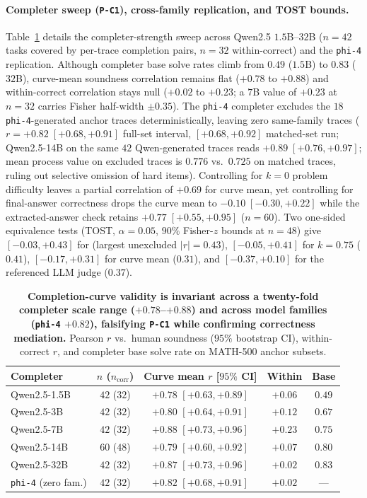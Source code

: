 \paragraph{Completer sweep (\texttt{P-C1}), cross-family replication, and TOST bounds.}
Table~\ref{tab:completer} details the completer-strength sweep across Qwen2.5 $1.5$B--$32$B ($n{=}42$ tasks covered by per-trace completion pairs, $n{=}32$ within-correct) and the \texttt{phi-4} replication.
Although completer base solve rates climb from $0.49$ ($1.5$B) to $0.83$ ($32$B), curve-mean soundness correlation remains flat ($+0.78$ to $+0.88$) and within-correct correlation stays null ($+0.02$ to $+0.23$; a $7$B value of $+0.23$ at $n{=}32$ carries Fisher half-width $\pm 0.35$).
The \texttt{phi-4} completer excludes the $18$ \texttt{phi-4}-generated anchor traces deterministically, leaving zero same-family traces ($r = +0.82 \; [+0.68, +0.91]$ full-set interval, $[+0.68, +0.92]$ matched-set run; Qwen2.5-14B on the same $42$ Qwen-generated traces reads $+0.89 \; [+0.76, +0.97]$; mean process value on excluded traces is $0.776$ vs.\ $0.725$ on matched traces, ruling out selective omission of hard items).
Controlling for $k{=}0$ problem difficulty leaves a partial correlation of $+0.69$ for curve mean, yet controlling for final-answer correctness drops the curve mean to $-0.10 \; [-0.30, +0.22]$ while the extracted-answer check retains $+0.77 \; [+0.55, +0.95]$ ($n{=}60$).
Two one-sided equivalence tests (TOST, $\alpha{=}0.05$, $90\%$ Fisher-$z$ bounds at $n{=}48$) give $[-0.03, +0.43]$ for \tfa{} (largest unexcluded $|r| = 0.43$), $[-0.05, +0.41]$ for $k{=}0.75$ ($0.41$), $[-0.17, +0.31]$ for curve mean ($0.31$), and $[-0.37, +0.10]$ for the referenced LLM judge ($0.37$).

\begin{table}[t]
\centering
\caption{\textbf{Completion-curve validity is invariant across a twenty-fold completer scale range ($+0.78$--$+0.88$) and across model families (\texttt{phi-4} $+0.82$), falsifying \texttt{P-C1} while confirming correctness mediation.} Pearson $r$ vs.\ human soundness ($95\%$ bootstrap CI), within-correct $r$, and completer base solve rate on \textsc{MATH-500} anchor subsets.}
\label{tab:completer}
\scriptsize
\setlength{\tabcolsep}{1.8pt}
\begin{tabular}{@{}lcccc@{}}
\toprule
Completer & $n$ ($n_{\text{corr}}$) & Curve mean $r$ [$95\%$ CI] & Within & Base \\
\midrule
Qwen2.5-1.5B & $42$ ($32$) & $+0.78$ $[+0.63, +0.89]$ & $+0.06$ & $0.49$ \\
Qwen2.5-3B & $42$ ($32$) & $+0.80$ $[+0.64, +0.91]$ & $+0.12$ & $0.67$ \\
Qwen2.5-7B & $42$ ($32$) & $+0.88$ $[+0.73, +0.96]$ & $+0.23$ & $0.75$ \\
Qwen2.5-14B & $60$ ($48$) & $+0.79$ $[+0.60, +0.92]$ & $+0.07$ & $0.80$ \\
Qwen2.5-32B & $42$ ($32$) & $+0.87$ $[+0.73, +0.96]$ & $+0.02$ & $0.83$ \\
\texttt{phi-4} (zero fam.) & $42$ ($32$) & $+0.82$ $[+0.68, +0.91]$ & $+0.02$ & --- \\
\bottomrule
\end{tabular}
\end{table}

